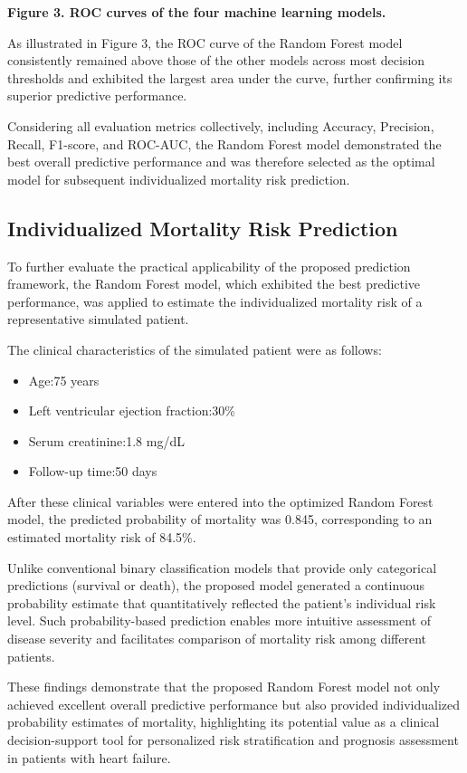 \documentclass[12pt]{article}
\begin{document}
\textbf{Figure 3. ROC curves of the four machine learning models.}

As illustrated in Figure 3, the ROC curve of the Random Forest model consistently remained above those of the other models across most decision thresholds and exhibited the largest area under the curve, further confirming its superior predictive performance.

Considering all evaluation metrics collectively, including Accuracy, Precision, Recall, F1-score, and ROC-AUC, the Random Forest model demonstrated the best overall predictive performance and was therefore selected as the optimal model for subsequent individualized mortality risk prediction. 

\subsection{Individualized Mortality Risk Prediction}

To further evaluate the practical applicability of the proposed prediction framework, the Random Forest model, which exhibited the best predictive performance, was applied to estimate the individualized mortality risk of a representative simulated patient.

The clinical characteristics of the simulated patient were as follows:

\begin{itemize}
    \item Age:75 years 
    \item Left ventricular ejection fraction:30\% 
    \item Serum creatinine:1.8 mg/dL 
    \item Follow-up time:50 days 
\end{itemize}
After these clinical variables were entered into the optimized Random Forest model, the predicted probability of mortality was 0.845, corresponding to an estimated mortality risk of 84.5\%.

Unlike conventional binary classification models that provide only categorical predictions (survival or death), the proposed model generated a continuous probability estimate that quantitatively reflected the patient's individual risk level. Such probability-based prediction enables more intuitive assessment of disease severity and facilitates comparison of mortality risk among different patients.

These findings demonstrate that the proposed Random Forest model not only achieved excellent overall predictive performance but also provided individualized probability estimates of mortality, highlighting its potential value as a clinical decision-support tool for personalized risk stratification and prognosis assessment in patients with heart failure.
\end{document}
